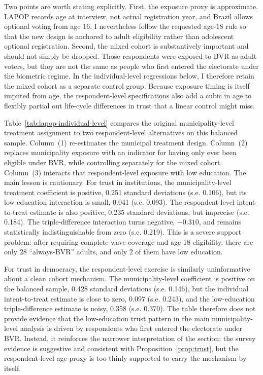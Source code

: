 Two points are worth stating explicitly. First, the exposure proxy is approximate. LAPOP records age at interview, not actual registration year, and Brazil allows optional voting from age 16. I nevertheless follow the requested age-18 rule so that the new design is anchored to adult eligibility rather than adolescent optional registration. Second, the mixed cohort is substantively important and should not simply be dropped. Those respondents were exposed to BVR as adult voters, but they are not the same as people who first entered the electorate under the biometric regime. In the individual-level regressions below, I therefore retain the mixed cohort as a separate control group. Because exposure timing is itself imputed from age, the respondent-level specifications also add a cubic in age to flexibly partial out life-cycle differences in trust that a linear control might miss.

\begin{table}[htbp]
    \caption{Municipality-level and Respondent-level BVR Exposure in LAPOP}
    \label{tab:lapop-individual-level}
    \centering
    
\end{table}

Table~\ref{tab:lapop-individual-level} compares the original municipality-level treatment assignment to two respondent-level alternatives on this balanced sample. Column~(1) re-estimates the municipal treatment design. Column~(2) replaces municipality exposure with an indicator for having only ever been eligible under BVR, while controlling separately for the mixed cohort. Column~(3) interacts that respondent-level exposure with low education. The main lesson is cautionary. For trust in institutions, the municipality-level treatment coefficient is positive, 0.251 standard deviations (s.e. 0.106), but its low-education interaction is small, 0.041 (s.e. 0.093). The respondent-level intent-to-treat estimate is also positive, 0.235 standard deviations, but imprecise (s.e. 0.184). The triple-difference interaction turns negative, $-0.310$, and remains statistically indistinguishable from zero (s.e. 0.219). This is a severe support problem: after requiring complete wave coverage and age-18 eligibility, there are only 28 ``always-BVR'' adults, and only 2 of them have low education.

For trust in democracy, the respondent-level exercise is similarly uninformative about a clean cohort mechanism. The municipality-level coefficient is positive on the balanced sample, 0.428 standard deviations (s.e. 0.146), but the individual intent-to-treat estimate is close to zero, 0.097 (s.e. 0.243), and the low-education triple-difference estimate is noisy, 0.358 (s.e. 0.370). The table therefore does not provide evidence that the low-education trust pattern in the main municipality-level analysis is driven by respondents who first entered the electorate under BVR. Instead, it reinforces the narrower interpretation of the section: the survey evidence is suggestive and consistent with Proposition~\ref{prop:trust}, but the respondent-level age proxy is too thinly supported to carry the mechanism by itself.

